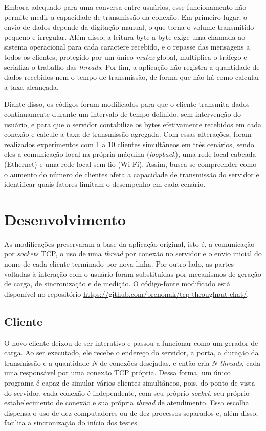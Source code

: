 \documentclass[12pt]{article}
\begin{document}
Embora adequado para uma conversa entre usuários, esse funcionamento não permite
medir a capacidade de transmissão da conexão. Em primeiro lugar, o envio de
dados depende da digitação manual, o que torna o volume transmitido pequeno e
irregular. Além disso, a leitura byte a byte exige uma chamada ao sistema
operacional para cada caractere recebido, e o repasse das mensagens a todos os
clientes, protegido por um único \textit{mutex} global, multiplica o tráfego e
serializa o trabalho das \textit{threads}. Por fim, a aplicação não registra a
quantidade de dados recebidos nem o tempo de transmissão, de forma que não há
como calcular a taxa alcançada.

Diante disso, os códigos foram modificados para que o cliente transmita dados
continuamente durante um intervalo de tempo definido, sem intervenção do
usuário, e para que o servidor contabilize os bytes efetivamente recebidos em
cada conexão e calcule a taxa de transmissão agregada. Com essas alterações,
foram realizados experimentos com 1 a 10 clientes simultâneos em três cenários,
sendo eles a comunicação local na própria máquina (\textit{loopback}), uma rede
local cabeada (Ethernet) e uma rede local sem fio (Wi-Fi). Assim, busca-se compreender como o
aumento do número de clientes afeta a capacidade de transmissão do servidor e
identificar quais fatores limitam o desempenho em cada cenário.

\section{Desenvolvimento}\label{sec:desenvolvimento}

As modificações preservaram a base da aplicação original, isto é, a comunicação
por \textit{sockets} TCP, o uso de uma \textit{thread} por conexão no servidor e
o envio inicial do nome de cada cliente terminado por nova linha. Por outro
lado, as partes voltadas à interação com o usuário foram substituídas por
mecanismos de geração de carga, de sincronização e de medição. O código-fonte
modificado está disponível no repositório
\url{https://github.com/brenonak/tcp-throughput-chat/}.

\subsection{Cliente}

O novo cliente deixou de ser interativo e passou a funcionar como um gerador de
carga. Ao ser executado, ele recebe o endereço do servidor, a porta, a duração
da transmissão e a quantidade $N$ de conexões desejadas, e então cria $N$
\textit{threads}, cada uma responsável por uma conexão TCP própria. Dessa forma,
um único programa é capaz de simular vários clientes simultâneos, pois, do ponto
de vista do servidor, cada conexão é independente, com seu próprio
\textit{socket}, seu próprio estabelecimento de conexão e sua própria
\textit{thread} de atendimento. Essa escolha dispensa o uso de dez computadores
ou de dez processos separados e, além disso, facilita a sincronização do início
dos testes.
\end{document}
